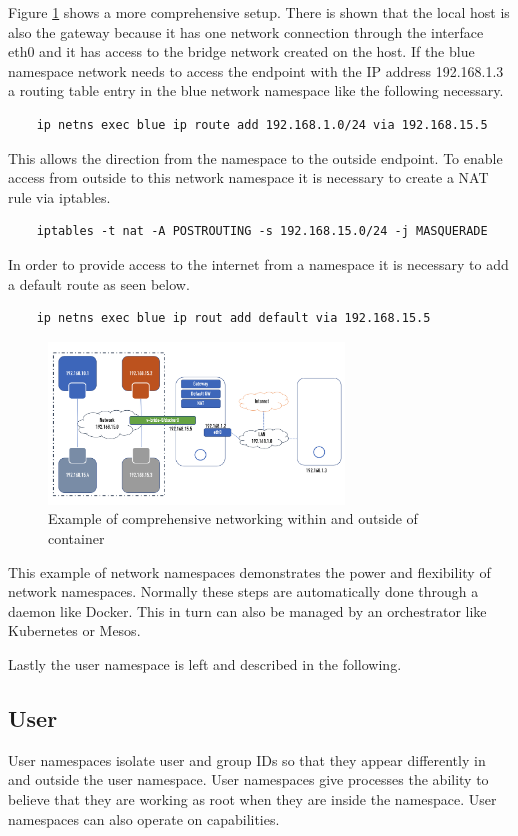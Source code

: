 Figure \ref{sec:intro:containerization:linux_namespaces:netowork_ns_out} shows a more comprehensive setup. 
There is shown that the local host is also the gateway because it has one network connection through the interface eth0 and it has access to the bridge network created on the host. If the blue namespace network needs to access the endpoint with the IP address 192.168.1.3 a routing table entry in the blue network namespace like the following necessary.
\begin{lstlisting}
	ip netns exec blue ip route add 192.168.1.0/24 via 192.168.15.5
\end{lstlisting}
This allows the direction from the namespace to the outside endpoint. To enable access from outside to this network namespace it is necessary to create a NAT rule via iptables.
\begin{lstlisting}
	iptables -t nat -A POSTROUTING -s 192.168.15.0/24 -j MASQUERADE	
\end{lstlisting}
In order to provide access to the internet from a namespace it is necessary to add a default route as seen below.
\begin{lstlisting}
	ip netns exec blue ip rout add default via 192.168.15.5
\end{lstlisting}
\begin{figure}[htbp]
 \centering
 \includegraphics[width=0.7\textwidth]{gfx/examples/network_ns_out}
 \caption{Example of comprehensive networking within and outside of container}
\label{sec:intro:containerization:linux_namespaces:netowork_ns_out}
\end{figure}
This example of network namespaces demonstrates the power and flexibility of network namespaces.
Normally these steps are automatically done through a daemon like Docker. This in turn can also be managed by an orchestrator like Kubernetes or Mesos.

Lastly the user namespace is left and described in the following.

\subsection{User}
\label{sec:intro:containerization:linux_namespaces:user_namespaces}
User namespaces isolate user and group IDs so that they appear differently in and outside the user namespace.
User namespaces give processes the ability to believe that they are working as root when they are inside the namespace.
User namespaces can also operate on capabilities. 

